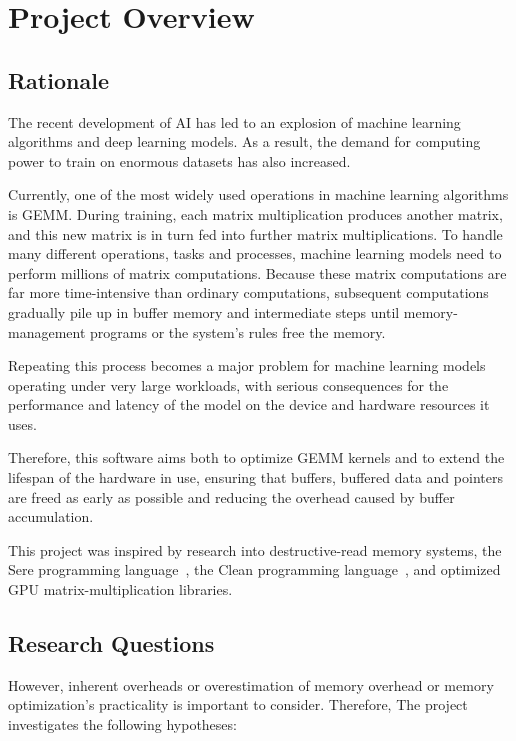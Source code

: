 \documentclass[a4paper]{article}
\begin{document}
	
	\newpage
	
	\section{Project Overview}
	\label{sec:overview}
	
	\subsection{Rationale}
	
	The recent development of AI has led to an explosion of machine learning algorithms and deep learning models. As a result, the demand for computing power to train on enormous datasets has also increased.
	
	Currently, one of the most widely used operations in machine learning algorithms is GEMM. During training, each matrix multiplication produces another matrix, and this new matrix is in turn fed into further matrix multiplications. To handle many different operations, tasks and processes, machine learning models need to perform millions of matrix computations. Because these matrix computations are far more time-intensive than ordinary computations, subsequent computations gradually pile up in buffer memory and intermediate steps until memory-management programs or the system's rules free the memory.
	
	Repeating this process becomes a major problem for machine learning models operating under very large workloads, with serious consequences for the performance and latency of the model on the device and hardware resources it uses.
	
	Therefore, this software aims both to optimize GEMM kernels and to extend the lifespan of the hardware in use, ensuring that buffers, buffered data and pointers are freed as early as possible and reducing the overhead caused by buffer accumulation.
	
	This project was inspired by research into destructive-read memory systems, the Sere programming language~\cite{sere}, the Clean programming language~\cite{clean}, and optimized GPU matrix-multiplication libraries.
	
	\subsection{Research Questions}
	
	However, inherent overheads or overestimation of memory overhead or memory optimization's practicality is important to consider. Therefore, The project investigates the following hypotheses:
	
\end{document}
